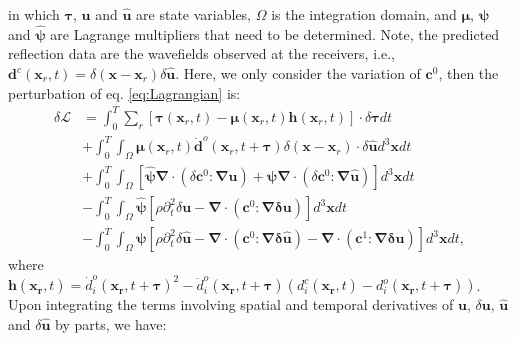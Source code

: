 \documentclass[extra,mreferee]{gji}
\newcommand{\bsy}[1]{\boldsymbol{{}#1}}
\begin{document}
in which $\bsy{\tau}$, $\mathbf{u}$ and $\mathbf{\hat{u}}$ are state variables, 
$\Omega$ is the integration domain, 
and 
$\bsy{\mu}$, $\bsy{\psi}$ and $\bsy{\hat \psi}$ are Lagrange multipliers that need to be determined.
Note, the predicted reflection data are the wavefields observed at the receivers, i.e.,
$\mathbf{d}^c(\mathbf{x}_r,t)=\delta(\mathbf{x}-\mathbf{x}_r)\delta\mathbf{\hat{u}}$.
Here, we only consider the variation of $\mathbf{c}^0$, then the perturbation of eq.
\eqref{eq:Lagrangian} is: 
\begin{equation}
	\begin{split}
		\delta\mathcal{L}
		&=\int^T_0\sum_{r}\left[\bsy{\tau}(\mathbf{x}_r,t)-\bsy{\mu}(\mathbf{x}_r,t)\mathbf{h}(\mathbf{x}_r,t)\right]\bsy{\cdot}\delta
		\bsy{\tau}dt \\
		&+\int^T_0\int_{\Omega}
		\bsy{\mu}(\mathbf{x}_r,t)\mathbf{\dot{d}}^o(\mathbf{x}_r,t+\bsy{\tau})\delta(\mathbf{x}-\mathbf{x}_r)\bsy{\cdot}\delta
		\mathbf{\hat{u}}d^3\mathbf{x}dt\\
		&+\int^T_0\int_{\Omega}\left[
		\bsy{\hat \psi}\bsy{\nabla\cdot}(\delta \mathbf{c}^0
		\bsy{:\nabla\mathbf{u}})
		+
		\bsy{\psi}\bsy{\nabla\cdot}(\delta \mathbf{c}^0
		\bsy{:\nabla\mathbf{\hat{u}}})\right]
		d^3\mathbf{x}dt\\
	&-\int^T_0\int_{\Omega} \bsy{\hat \psi}\left[\rho\partial^2_t \delta\mathbf{u} -\bsy{\nabla
	\cdot}
	(\bsy{\mathbf{c}}^0\bsy{:\nabla\delta\mathbf{u}})\right]d^3\mathbf{x}dt\\
	&-\int^T_0\int_{\Omega} \bsy{\psi}\left[\rho\partial^2_t
	\delta\mathbf{\hat{u}}-\bsy{\nabla\cdot}(\bsy{\mathbf{c}}^0\bsy{:\nabla\delta\mathbf{\hat{u}}})-
	\bsy{\nabla\cdot}(\mathbf{c}^1\bsy{:\nabla\delta\mathbf{u}})\right]d^3\mathbf{x}dt,
	\end{split}
        \label{eq:DeltaLagrangian1}
\end{equation}
where 
$\mathbf{h}(\mathbf{x_r},t)=\dot{d}^o_i(\mathbf{x_r},t+\bsy{\tau})^2-\ddot{d}^o_i(\mathbf{x_r},t+\bsy{\tau})
(d^c_i(\mathbf{x_r},t)-d^o_i(\mathbf{x_r},t+\bsy{\tau}))$.
Upon integrating the terms involving spatial and temporal derivatives of $\mathbf{u}$,
$\delta\mathbf{u}$, $\mathbf{\hat{u}}$ and $\delta\mathbf{\hat{u}}$
by parts, we have:
\end{document}
